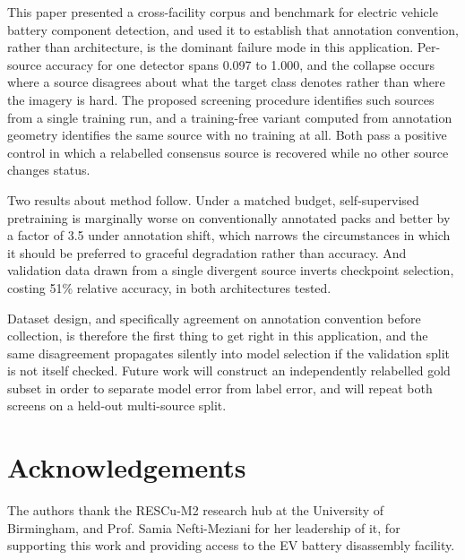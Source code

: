 \documentclass[conference]{IEEEtran}
\newif\ifanon\anonfalse
\begin{document}
This paper presented a cross-facility corpus and benchmark for electric vehicle
battery component detection, and used it to establish that annotation convention,
rather than architecture, is the dominant failure mode in this application.
Per-source accuracy for one detector spans 0.097 to 1.000, and the collapse occurs
where a source disagrees about what the target class denotes rather than where the
imagery is hard. The proposed screening procedure identifies such sources from a
single training run, and a training-free variant computed from annotation geometry
identifies the same source with no training at all. Both pass a positive control in
which a relabelled consensus source is recovered while no other source changes status.

Two results about method follow. Under a matched budget, self-supervised pretraining
is marginally worse on conventionally annotated packs and better by a factor of 3.5
under annotation shift, which narrows the circumstances in which it should be
preferred to graceful degradation rather than accuracy. And validation data drawn from
a single divergent source inverts checkpoint selection, costing 51\% relative
accuracy, in both architectures tested.

Dataset design, and specifically agreement on annotation convention before collection,
is therefore the first thing to get right in this application, and the same
disagreement propagates silently into model selection if the validation split is not
itself checked. Future work will construct an independently relabelled gold subset in
order to separate model error from label error, and will repeat both screens on a
held-out multi-source split.

\ifanon\else
\section*{Acknowledgements}
The authors thank the RESCu-M2 research hub at the University of Birmingham, and
Prof. Samia Nefti-Meziani for her leadership of it, for supporting this work and
providing access to the EV battery disassembly facility.
\fi
\end{document}
